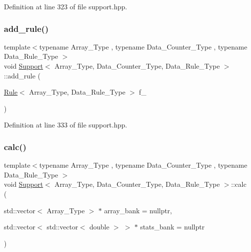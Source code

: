 Definition at line 323 of file support.\+hpp.

\mbox{\label{class_support_aa817cb5d6c48dda3ecfeef2c5897b537}} 
\subsubsection{\texorpdfstring{add\+\_\+rule()}{add\_rule()}\hspace{0.1cm}{\footnotesize\ttfamily [2/2]}}
{\footnotesize\ttfamily template$<$typename Array\+\_\+\+Type , typename Data\+\_\+\+Counter\+\_\+\+Type , typename Data\+\_\+\+Rule\+\_\+\+Type $>$ \\
void \hyperlink{class_support}{Support}$<$ Array\+\_\+\+Type, Data\+\_\+\+Counter\+\_\+\+Type, Data\+\_\+\+Rule\+\_\+\+Type $>$\+::add\+\_\+rule (\begin{DoxyParamCaption}\item[{\hyperlink{class_rule}{Rule}$<$ Array\+\_\+\+Type, Data\+\_\+\+Rule\+\_\+\+Type $>$}]{f\+\_\+ }\end{DoxyParamCaption})\hspace{0.3cm}{\ttfamily [inline]}}



Definition at line 333 of file support.\+hpp.

\mbox{\label{class_support_afa36b8c1348e28c51296379157f58081}} 
\subsubsection{\texorpdfstring{calc()}{calc()}}
{\footnotesize\ttfamily template$<$typename Array\+\_\+\+Type , typename Data\+\_\+\+Counter\+\_\+\+Type , typename Data\+\_\+\+Rule\+\_\+\+Type $>$ \\
void \hyperlink{class_support}{Support}$<$ Array\+\_\+\+Type, Data\+\_\+\+Counter\+\_\+\+Type, Data\+\_\+\+Rule\+\_\+\+Type $>$\+::calc (\begin{DoxyParamCaption}\item[{std\+::vector$<$ Array\+\_\+\+Type $>$ $\ast$}]{array\+\_\+bank = {\ttfamily nullptr},  }\item[{std\+::vector$<$ std\+::vector$<$ double $>$ $>$ $\ast$}]{stats\+\_\+bank = {\ttfamily nullptr} }\end{DoxyParamCaption})\hspace{0.3cm}{\ttfamily [inline]}}



